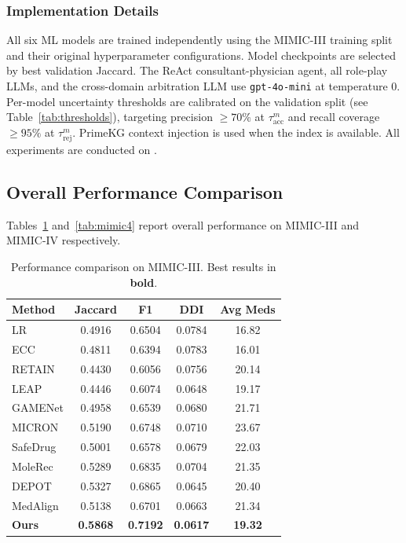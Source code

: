 \documentclass[sigconf,anonymous]{acmart}
\begin{document}
\subsubsection{Implementation Details}
All six ML models are trained independently using the MIMIC-III training split and their original hyperparameter configurations. Model checkpoints are selected by best validation Jaccard. The ReAct consultant-physician agent, all role-play LLMs, and the cross-domain arbitration LLM use \texttt{gpt-4o-mini} at temperature 0. Per-model uncertainty thresholds are calibrated on the validation split (see Table~\ref{tab:thresholds}), targeting precision $\geq 70\%$ at $\tau_{\text{acc}}^m$ and recall coverage $\geq 95\%$ at $\tau_{\text{rej}}^m$. PrimeKG context injection is used when the index is available. All experiments are conducted on .

\subsection{Overall Performance Comparison}

Tables~\ref{tab:mimic3} and~\ref{tab:mimic4} report overall performance on MIMIC-III and MIMIC-IV respectively.

\begin{table}[h]
\centering
\caption{Performance comparison on MIMIC-III. Best results in \textbf{bold}.}
\label{tab:mimic3}
\begin{tabular}{lcccc}
\hline
\textbf{Method} & \textbf{Jaccard} & \textbf{F1} & \textbf{DDI} & \textbf{Avg Meds} \\
\hline
LR      & 0.4916 & 0.6504 & 0.0784 & 16.82 \\
ECC     & 0.4811 & 0.6394 & 0.0783 & 16.01 \\
RETAIN  & 0.4430 & 0.6056 & 0.0756 & 20.14 \\
LEAP    & 0.4446 & 0.6074 & 0.0648 & 19.17 \\
GAMENet & 0.4958 & 0.6539 & 0.0680 & 21.71 \\
MICRON  & 0.5190 & 0.6748 & 0.0710 & 23.67 \\
SafeDrug& 0.5001 & 0.6578 & 0.0679 & 22.03 \\
MoleRec & 0.5289 & 0.6835 & 0.0704 & 21.35 \\
DEPOT   & 0.5327 & 0.6865 & 0.0645 & 20.40 \\
MedAlign& 0.5138 & 0.6701 & 0.0663 & 21.34 \\
\hline
\textbf{Ours} & \textbf{0.5868} & \textbf{0.7192} & \textbf{0.0617} & \textbf{19.32} \\
\hline
\end{tabular}
\end{table}
\end{document}
